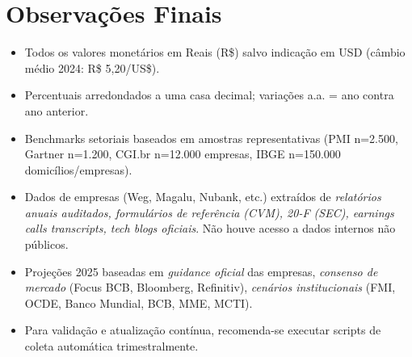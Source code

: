 \section*{Observações Finais}
\begin{itemize}
    \item Todos os valores monetários em Reais (R\$) salvo indicação em USD (câmbio médio 2024: R\$ 5,20/US\$).
    \item Percentuais arredondados a uma casa decimal; variações a.a. = ano contra ano anterior.
    \item Benchmarks setoriais baseados em amostras representativas (PMI n=2.500, Gartner n=1.200, CGI.br n=12.000 empresas, IBGE n=150.000 domicílios/empresas).
    \item Dados de empresas (Weg, Magalu, Nubank, etc.) extraídos de \textit{relatórios anuais auditados, formulários de referência (CVM), 20-F (SEC), earnings calls transcripts, tech blogs oficiais}. Não houve acesso a dados internos não públicos.
    \item Projeções 2025 baseadas em \textit{guidance oficial} das empresas, \textit{consenso de mercado} (Focus BCB, Bloomberg, Refinitiv), \textit{cenários institucionais} (FMI, OCDE, Banco Mundial, BCB, MME, MCTI).
    \item Para validação e atualização contínua, recomenda-se executar scripts de coleta automática trimestralmente.
\end{itemize}
